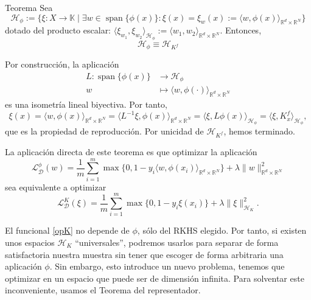 \documentclass{beamer}
\makeatletter
\renewenvironment{proof}[1][\proofname]{%
  \par\pushQED{\qed}%
  \normalfont
  \topsep6\p@\@plus6\p@\relax
  \trivlist
  \item[\hskip\labelsep\itshape #1\@addpunct{.}]
}{%
  \popQED\endtrivlist\@endpefalse
}
\makeatother
\begin{document}
\begin{frame}
    \begin{block}{Teorema}
        Sea 
        \[
        \mathcal{H}_\phi := \{\xi:X\to\mathbb{K} \mid \exists w \in \operatorname{span}\{\phi(x)\} : \xi(x) = \xi_w(x) := \langle w,\phi(x) \rangle_{\mathbb{R}^d\times\mathbb{R}^N}\} 
        \] 
        dotado del producto escalar:
        \(
        \langle \xi_{w_1},\xi_{w_2} \rangle_{\mathcal{H}_\phi} := \langle w_1,w_2 \rangle_{\mathbb{R}^d\times\mathbb{R}^N}.
        \)
        Entonces,
        \[
        \mathcal{H}_\phi \equiv \mathcal{H}_{K^f}
        \]
    \end{block}

    \begin{proof}
        Por construcción, la aplicación
    \[
    \begin{aligned}
        L : \operatorname{span}\{\phi(x)\} &\longrightarrow \mathcal{H_\phi} \\
        w &\longmapsto \langle w,\phi(\cdot) \rangle_{\mathbb{R}^d\times\mathbb{R}^N}
    \end{aligned}
    \]
    es una isometría lineal biyectiva. Por tanto,
    \[
    \xi(x) = \langle w,\phi(x) \rangle_{\mathbb{R}^d\times\mathbb{R}^N} = \langle L^{-1}\xi,\phi(x) \rangle_{\mathbb{R}^d\times\mathbb{R}^N} = \langle \xi,L\phi(x) \rangle_{\mathcal{H}_\phi} = \langle \xi,K_x^f \rangle_{\mathcal{H}_\phi},
    \]
    que es la propiedad de reproducción. Por unicidad de \(\mathcal{H}_{K^f}\), hemos terminado.
    \end{proof}
    
\end{frame}

\begin{frame}
    La aplicación directa de este teorema es que optimizar la aplicación
    \[
    \mathscr{L}_{\mathcal{D}}^\phi(w) = \frac{1}{m} \sum_{i=1}^m \max\{0,1-y_i \langle w,\phi(x_i) \rangle_{\mathbb{R}^d\times\mathbb{R}^N}\} + \lambda \lVert w \rVert_{\mathbb{R}^d\times\mathbb{R}^N}^2
    \]
    sea equivalente a optimizar
    \begin{equation} \label{opK}
        \mathscr{L}_{\mathcal{D}}^K(\xi) = \frac{1}{m} \sum_{i=1}^m \max\{0,1-y_i \xi(x_i)\} + \lambda \lVert \xi \rVert_{\mathcal{H}_K}^2.
    \end{equation}

    El funcional \eqref{opK} no depende de \(\phi\), sólo del RKHS elegido. Por tanto, si existen unos espacios \(\mathcal{H}_K\) ``universales'', podremos usarlos para separar de forma satisfactoria nuestra muestra sin tener que escoger de forma arbitraria una aplicación \(\phi\). Sin embargo, esto introduce un nuevo problema, tenemos que optimizar en un espacio que puede ser de dimensión infinita. Para solventar este inconveniente, usamos el Teorema del representador.
    
\end{frame}
\end{document}
